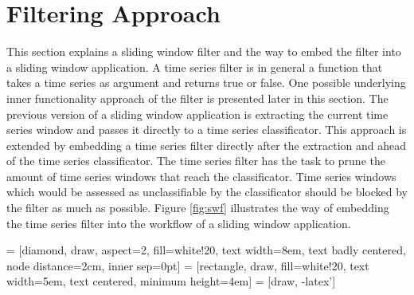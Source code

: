 \section{Filtering Approach} \label{filtering_approach}
This section explains a sliding window filter and the way to embed the filter into a sliding window application. A time
series filter is in general a function that takes a time
series as argument and returns true or false. One possible underlying inner functionality approach of the filter is
presented later in this section. The previous version of a sliding window application is extracting the current time
series window and passes it directly to a time series classificator. This approach is extended by embedding a time
series filter directly after the extraction and ahead of the time series classificator. The time series filter has the
task to prune the amount of time series windows that reach the classificator. Time series windows which would be
assessed as unclassifiable by the classificator should be blocked by the filter as much as possible. Figure
\ref{fig:swf} illustrates the way of embedding the time series filter into the workflow of a sliding window application.

 = [diamond, draw, aspect=2, fill=white!20, text width=8em, text badly centered, node distance=2cm, inner sep=0pt]
 = [rectangle, draw, fill=white!20, text width=5em, text centered, minimum height=4em]
 = [draw, -latex']

